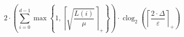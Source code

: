 \[2 \cdot \left(\sum_{i=0}^{d-1} \max\left\{ 1, \left\lceil \sqrt{\frac{L\left(i\right)}{\mu}} \right\rceil_{+} \right\}\right) \cdot \operatorname{clog}_{2}\left(\left\lceil \frac{2 \cdot \Delta}{\varepsilon} \right\rceil_{+}\right)\]
